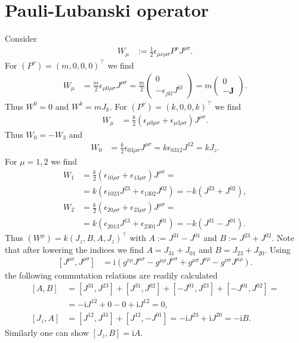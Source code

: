\documentclass[english, parskip=full]{scrartcl}
\newcommand{\kla}{}
\newcommand{\klam}{}
\renewcommand{\i}{\text{i}}
\begin{document}
\section{Pauli-Lubanski operator}
Consider
\begin{align}
W_\mu &:= \frac{1}{2} \epsilon_{\mu\nu\rho\sigma} P^\nu J^{\rho\sigma}.
\end{align}
For $(P^\nu) = (m,0,0,0)^\top$ we find
\begin{align}
W_\mu &= \frac{m}{2} \epsilon_{\mu 0 \rho \sigma} J^{\rho\sigma} = \frac{m}{2} \begin{pmatrix}
0 \\ -\epsilon_{jkl} J^{kl}
\end{pmatrix} = m \begin{pmatrix}
0 \\ -\textbf{J}
\end{pmatrix}.
\end{align}
Thus $W^0=0$ and $W^k = mJ_k$.
For $(P^\nu) = (k,0,0,k)^\top$ we find
\begin{align}
W_\mu &= \frac{k}{2} \kla\left( \epsilon_{\mu 0 \rho \sigma} + \epsilon_{\mu 3 \rho \sigma} \right) J^{\rho\sigma}.
\end{align}
Thus $W_0 = - W_3$ and
\begin{align}
W_0 &= \frac{k}{2} \epsilon_{03 \rho \sigma} J^{\rho\sigma} = k\epsilon_{0312}J^{12} = kJ_z.
\end{align}
For $\mu=1,2$ we find
\begin{align}
W_1 &= \frac{k}{2} \left( \epsilon_{1 0 \rho \sigma} + \epsilon_{1 3 \rho \sigma} \right) J^{\rho\sigma} = \\
&= k\kla\left( \epsilon_{1023} J^{23} + \epsilon_{1302}J^{02} \right) = -k \kla\left( J^{23} + J^{02} \right),\\
W_2 &= \frac{k}{2} \left( \epsilon_{2 0 \rho \sigma} + \epsilon_{2 3 \rho \sigma} \right) J^{\rho\sigma} = \\
&= k\kla\left( \epsilon_{2013} J^{13} + \epsilon_{2301}J^{01} \right) = -k \kla\left( J^{31} - J^{01} \right).
\end{align}
Thus $(W^\mu) = k(J_z, B, A, J_z)^\top$ with $A := J^{31} - J^{01}$ and $B := J^{23} + J^{02}$.
Note that after lowering the indices we find $A = J_{31} + J_{01}$ and $B = J_{23} + J_{20}$.
Using
\begin{align}
\left[ J^{\mu\nu}, J^{\rho\sigma} \right] &= \i\left( g^{\nu\rho} J^{\mu\sigma} - g^{\mu\rho} J^{\nu\sigma} + g^{\mu\sigma} J^{\nu\rho} - g^{\nu\sigma} J^{\mu\rho} \right).
\end{align}
the following commutation relations are readily calculated
\begin{align}
\left[ A, B \right] &= \left[ J^{31}, J^{23} \right] + \left[ J^{31}, J^{02} \right] + \left[ -J^{01}, J^{23} \right] + \left[ -J^{01}, J^{02} \right] = \\
&=  -\i J^{12} + 0 - 0 + \i J^{12} = 0,\\
\left[ J_z, A \right] &= \klam\left[ J^{12}, J^{31} \right] + \klam\left[ J^{12}, -J^{01} \right] = -\i J^{23} + \i J^{20} = -\i B.
\end{align}
Similarly one can show $\klam\left[ J_z, B \right] = \i A$.


\end{document}
